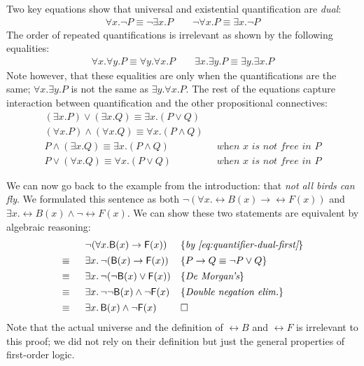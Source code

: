 Two key equations show that universal and existential
quantification are \emph{dual}:
%
\begin{align}
  \label{eq:quantifier-dual-first}
  \forall x . \neg P \equiv \neg \exists x . P
  \qquad
   \neg \forall x . P \equiv \exists x . \neg P
\end{align}
%
The order of repeated quantifications is irrelevant as shown by
the following equalities:
%
\begin{align}
  \forall x . \forall y. P \equiv \forall y . \forall x . P
  \qquad
  \exists x . \exists y . P \equiv \exists y . \exists x . P
\end{align}
%
Note however, that these equalities are only when the quantifications
are the same; $\forall x . \exists y . P$ is not the same as
$\exists y . \forall x . P$.
The rest of the equations capture interaction between quantification
and the other propositional connectives:
%
\begin{align}
  (\exists x . P) \vee (\exists x . Q) \equiv \exists x . (P \vee Q) \\
  (\forall x . P) \wedge (\forall x . Q) \equiv \forall x . (P \wedge
                                                                       Q) \\
  P \wedge (\exists x . Q) \equiv \exists x . (P \wedge Q) & \;\; \textit{when $x$ is  not free in $P$} \\
  P \vee (\forall x . Q) \equiv \forall x . (P \vee Q) & \;\;
 \textit{when $x$ is  not free in $P$}
\end{align}
\vspace{-2em}
\begin{example}
  We can now go back to the example from the introduction: that
  \emph{not all birds can fly}. We formulated this sentence as both
  $\neg (\forall x . \rel{B}(x) \rightarrow \rel{F}(x))$ and
  $\exists x . \rel{B}(x) \wedge \neg \rel{F}(x)$.
  We can show these two statements are equivalent by algebraic
  reasoning:
%
\begin{align*}
\begin{array}{rll}
    & \neg (\forall x . \mathsf{B}(x) \rightarrow \mathsf{F}(x)) & \{\textit{by \eqref{eq:quantifier-dual-first}}\} \\[0.4em]
  \equiv \;\; &  \exists x . \, \neg (\mathsf{B}(x) \rightarrow
                \mathsf{F}(x)) & \{\textit{$P \rightarrow Q \equiv \neg P
                              \vee Q$}\} \\[0.4em]
  \equiv \;\; & \exists x . \,\neg (\neg \mathsf{B}(x) \vee \mathsf{F}(x))
& \{\textit{De Morgan's}\} \\[0.4em]
  \equiv \;\; & \exists x . \,\neg \neg \mathsf{B}(x) \wedge \neg
                \mathsf{F}(x)
& \{\textit{Double negation elim.}\} \\[0.4em]
  \equiv \;\; & \exists x . \,\mathsf{B}(x) \wedge \neg \mathsf{F}(x) & \Box
\end{array}
\end{align*}
  Note that the actual universe and the definition of $\rel{B}$ and
  $\rel{F}$ is irrelevant to this proof; we did not rely on their
  definition but just the general properties of first-order logic.
\end{example}

